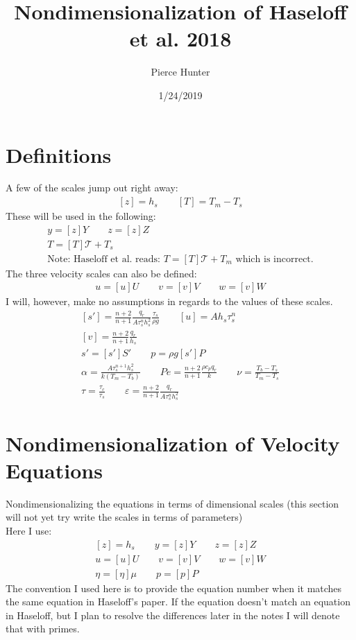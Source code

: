 \documentclass[10pt, letterpaper, twoside]{article}
\title{Nondimensionalization of Haseloff et al. 2018}
\author{Pierce Hunter}
\date{1/24/2019}
\begin{document}
	\maketitle
	\section{Definitions}
	A few of the scales jump out right away:
	\begin{gather*}
		\left[z\right] = h_s \qquad
		\left[T\right] = T_m-T_s
	\end{gather*}
	These will be used in the following:
	\begin{gather*}
		y = \left[z\right]Y \qquad
		z = \left[z\right]Z\\
		T = \left[T\right]\mathcal{T} + T_s\\
		\text{Note: Haseloff et al. reads: }T = \left[T\right]\mathcal{T} + T_m \text{ which is incorrect.}
	\end{gather*}
	The three velocity scales can also be defined:
	\begin{gather*}
		u = \left[u\right]U \qquad
		v = \left[v\right]V \qquad
		w = \left[v\right]W
	\end{gather*}
	I will, however, make no assumptions in regards to the values of these scales.
	\begin{gather*}
		\left[s'\right] = \frac{n+2}{n+1}\frac{q_r}{A\tau_s^nh_s^2}\frac{\tau_s}{\rho g} \qquad
		\left[u\right] = Ah_s\tau_s^n\\
		\left[v\right] = \frac{n+2}{n+1}\frac{q_r}{h_s}\\
		s' = \left[s'\right]S' \qquad
		p = \rho g \left[s'\right]P\\
		\alpha = \frac{A\tau_s^{n+1}h_s^2}{k\left(T_m-T_b\right)} \qquad
		Pe = \frac{n+2}{n+1}\frac{\rho c_pq_r}{k} \qquad
		\nu = \frac{T_b-T_s}{T_m-T_s}\\
		\tau = \frac{\tau_c}{\tau_s} \qquad
		\varepsilon = \frac{n+2}{n+1}\frac{q_r}{A\tau_s^nh_s^2}
	\end{gather*}
	
	\section{Nondimensionalization of Velocity Equations}
	Nondimensionalizing the equations in terms of dimensional scales (this section will not yet try write the scales in terms of parameters)\\
	Here I use:
	\begin{gather*}
		\left[z\right] = h_s \qquad
		y = \left[z\right]Y \qquad
		z = \left[z\right]Z\\
		u = \left[u\right]U \qquad
		v = \left[v\right]V \qquad
		w = \left[v\right]W\\
		\eta = \left[\eta\right]\mu \qquad
		p = \left[p\right]P
	\end{gather*}
	The convention I used here is to provide the equation number when it matches the same equation in Haseloff's paper. If the equation doesn't match an equation in Haseloff, but I plan to resolve the differences later in the notes I will denote that with primes.
\end{document}
